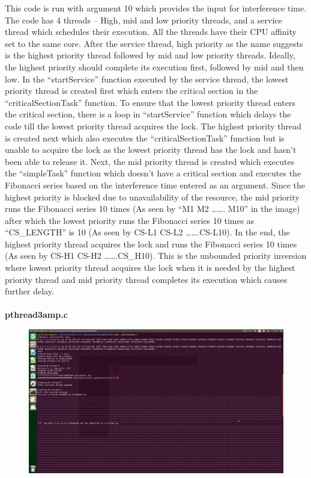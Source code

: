 \documentclass[a4paper,11pt]{article}%
\newenvironment{qanda}{\setlength{\parindent}{0pt}}{\bigskip}
\begin{document}
\begin{qanda}
\begin{enumerate}
\begin{enumerate}
\begin{enumerate}
					            This code is run with argument 10 which provides the input for interference time. The code has 4 threads – High, mid and low priority threads, and a service thread which schedules their execution. All the threads have their CPU affinity set to the same core. After the service thread, high priority as the name suggests is the highest priority thread followed by mid and low priority threads. Ideally, the highest priority should complete its execution first, followed by mid and then low. In the “startService” function executed by the service thread, the lowest priority thread is created first which enters the critical section in the “criticalSectionTask” function. To ensure that the lowest priority thread enters the critical section, there is a loop in “startService” function which delays the code till the lowest priority thread acquires the lock. The highest priority thread is created next which also executes the “criticalSectionTask” function but is unable to acquire the lock as the lowest priority thread has the lock and hasn’t been able to release it. Next, the mid priority thread is created which executes the “simpleTask” function which doesn’t have a critical section and executes the Fibonacci series based on the interference time entered as an argument. Since the highest priority is blocked due to unavailability of the resource, the mid priority runs the Fibonacci series 10 times (As seen by “M1 M2 ……. M10” in the image) after which the lowest priority runs the Fibonacci series 10 times as “CS\_LENGTH” is 10 (As seen by CS-L1 CS-L2 …….CS-L10). In the end, the highest priority thread acquires the lock and runs the Fibonacci series 10 times (As seen by CS-H1 CS-H2 …….CS\_H10). This is the unbounded priority inversion where lowest priority thread acquires the lock when it is needed by the highest priority thread and mid priority thread completes its execution which causes further delay.\\\\
					            \textbf{pthread3amp.c}
								\begin{figure}[H]
									\centering
									\includegraphics[scale=0.3]{figures/pthread3amp.png}

\end{figure}
\end{enumerate}
\end{enumerate}
\end{enumerate}
\end{qanda}
\end{document}
